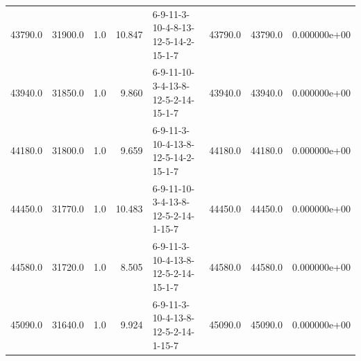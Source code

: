 \begin{tabular}{rrrrlrrr}
 43790.0 &  31900.0 &            1.0 &             10.847 &  6-9-11-3-10-4-8-13-12-5-14-2-15-1-7 &       43790.0 &         43790.0 &  0.000000e+00 \\
 43940.0 &  31850.0 &            1.0 &              9.860 &  6-9-11-10-3-4-13-8-12-5-2-14-15-1-7 &       43940.0 &         43940.0 &  0.000000e+00 \\
 44180.0 &  31800.0 &            1.0 &              9.659 &  6-9-11-3-10-4-13-8-12-5-14-2-15-1-7 &       44180.0 &         44180.0 &  0.000000e+00 \\
 44450.0 &  31770.0 &            1.0 &             10.483 &  6-9-11-10-3-4-13-8-12-5-2-14-1-15-7 &       44450.0 &         44450.0 &  0.000000e+00 \\
 44580.0 &  31720.0 &            1.0 &              8.505 &  6-9-11-3-10-4-13-8-12-5-2-14-15-1-7 &       44580.0 &         44580.0 &  0.000000e+00 \\
 45090.0 &  31640.0 &            1.0 &              9.924 &  6-9-11-3-10-4-13-8-12-5-2-14-1-15-7 &       45090.0 &         45090.0 &  0.000000e+00 \\
\bottomrule
\end{tabular}
